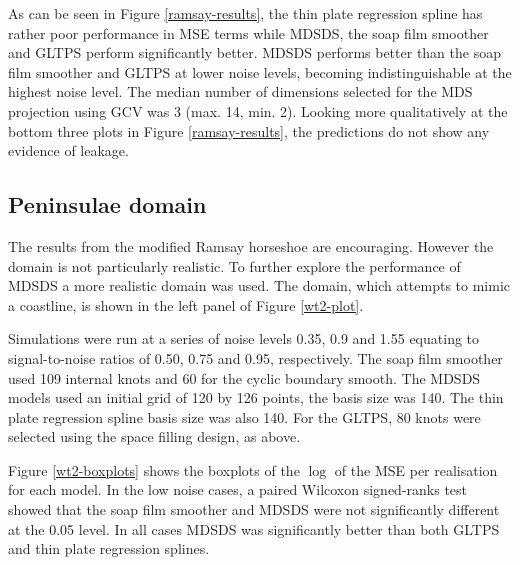 \documentclass[smallextended]{svjour3}       %
\begin{document}
As can be seen in Figure \ref{ramsay-results}, the thin plate regression spline has rather poor performance in MSE terms while MDSDS, the soap film smoother and GLTPS perform significantly better. MDSDS performs better than the soap film smoother and GLTPS at lower noise levels, becoming indistinguishable at the highest noise level. The median number of dimensions selected for the MDS projection using GCV was 3 (max. 14, min. 2). Looking more qualitatively at the bottom three plots in Figure \ref{ramsay-results}, the predictions do not show any evidence of leakage.


\subsection{Peninsulae domain}

The results from the modified Ramsay horseshoe are encouraging. However the domain is not particularly realistic. To further explore the performance of MDSDS a more realistic domain was used. The domain, which attempts to mimic a coastline, is shown in the left panel of Figure \ref{wt2-plot}.

Simulations were run at a series of noise levels 0.35, 0.9 and 1.55 equating to signal-to-noise ratios of 0.50, 0.75 and 0.95, respectively. The soap film smoother used 109 internal knots and 60 for the cyclic boundary smooth. The MDSDS models used an initial grid of 120 by 126 points, the basis size was 140. The thin plate regression spline basis size was also 140. For the GLTPS, 80 knots were selected using the space filling design, as above.

Figure \ref{wt2-boxplots} shows the boxplots of the $\log$ of the MSE per realisation for each model. In the low noise cases, a paired Wilcoxon signed-ranks test showed that the soap film smoother and MDSDS were not significantly different at the 0.05 level. In all cases MDSDS was significantly better than both GLTPS and thin plate regression splines.

\end{document}
